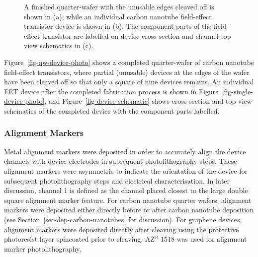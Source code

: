 \documentclass[
  letterpaper,
  DIV=11,
  numbers=noendperiod]{scrartcl}
\begin{document}
\begin{figure}
\begin{minipage}[t]{0.47\linewidth}
{{}

}

\subcaption{\label{fig-device-schematic}}
\end{minipage}%

\caption{\label{fig-field-effect-transistor}A finished quarter-wafer
with the unusable edges cleaved off is shown in (a), while an individual
carbon nanotube field-effect transistor device is shown in (b). The
component parts of the field-effect transistor are labelled on device
cross-section and channel top view schematics in (c).}

\end{figure}

Figure~\ref{fig-qw-device-photo} shows a completed quarter-wafer of
carbon nanotube field-effect transistors, where partial (unusable)
devices at the edges of the wafer have been cleaved off so that only a
square of nine devices remains. An individual FET device after the
completed fabrication process is shown in
Figure~\ref{fig-single-device-photo}, and
Figure~\ref{fig-device-schematic} shows cross-section and top view
schematics of the completed device with the component parts labelled.

\hypertarget{sec-align}{%
\subsubsection{Alignment Markers}\label{sec-align}}

Metal alignment markers were deposited in order to accurately align the
device channels with device electrodes in subsequent photolithography
steps. These alignment markers were asymmetric to indicate the
orientation of the device for subsequent photolithography steps and
electrical characterisation. In later discussion, channel 1 is defined
as the channel placed closest to the large double square alignment
marker feature. For carbon nanotube quarter wafers, alignment markers
were deposited either directly before or after carbon nanotube
deposition (see Section~\ref{sec-dep-carbon-nanotubes} for discussion).
For graphene devices, alignment markers were deposited directly after
cleaving using the protective photoresist layer spincoated prior to
cleaving. AZ\(^\circledR\) 1518 was used for alignment marker
photolithography.
\end{document}
